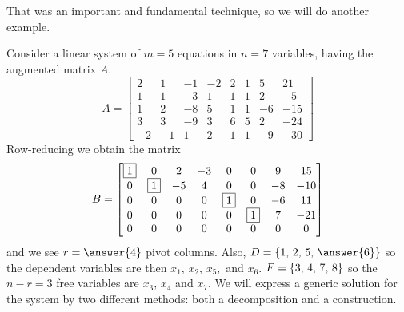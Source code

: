 \documentclass{ximera}
\begin{document}
That was an important and fundamental technique, so we will do another
example.

\begin{example}
  Consider a linear system of $m=5$ equations in $n=7$ variables,
  having the augmented matrix $A$.
  \[
    A=
    \begin{bmatrix}
      2 & 1 & -1 & -2 & 2 & 1 & 5 & 21 \\
      1 & 1 & -3 & 1 & 1 & 1 & 2 & -5 \\
      1 & 2 & -8 & 5 & 1 & 1 & -6 & -15 \\
      3 & 3 & -9 & 3 & 6 & 5 & 2 & -24 \\
      -2 & -1 & 1 & 2 & 1 & 1 & -9 & -30
    \end{bmatrix}
  \]
  Row-reducing we obtain the matrix
  \[
    B=
    \begin{bmatrix}
      \fbox{1} & 0 & 2 & -3 & 0 & 0 & 9 &  15 \\
      0 & \fbox{1} & -5 & 4 & 0 & 0 & -8 &  -10 \\
      0 & 0 & 0 & 0 & \fbox{1} & 0 & -6 &  11 \\
      0 & 0 & 0 & 0 & 0 & \fbox{1} & 7 &  -21 \\
      0 & 0 & 0 & 0 & 0 & 0 & 0 & 0
    \end{bmatrix}
  \]
  and we see $r=\answer{4}$ pivot columns. Also,
  $D=\set{1,\,2,\,5,\,\answer{6}}$ so the dependent variables are then
  $x_1,\,x_2,\,x_5,$ and $x_6$.  $F=\left\{3,\,4,\,7,\,8\right\}$ so the
  $n-r=3$ free variables are $x_3,\,x_4$ and $x_7$.  We will express a
  generic solution for the system by two different methods: both a
  decomposition and a construction.


\end{example}
\end{document}
